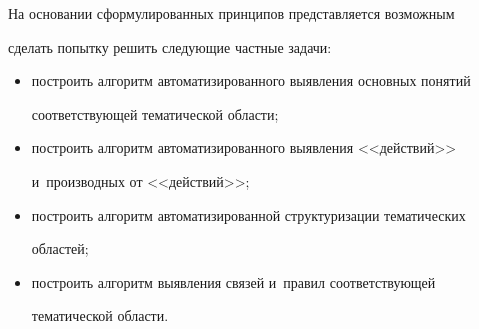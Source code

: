   На основании сформулированных принципов представляется возможным


сделать попытку решить следующие частные задачи:


  \begin{itemize}


  \item построить алгоритм автоматизированного выявления основных понятий


соответствующей тематической области;


  \item построить алгоритм автоматизированного выявления <<действий>>


и~производных от <<действий>>;


  \item  построить алгоритм автоматизированной структуризации тематических


областей;


  \item  построить алгоритм выявления связей и~правил соответствующей


тематической области.


  \end{itemize}





